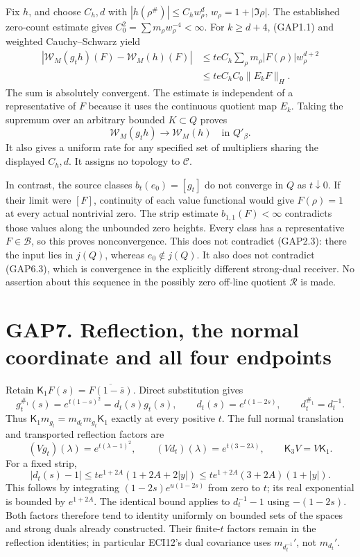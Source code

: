 Fix \(h\), and choose \(C_h,d\) with \(|h(\rho^\#)|\le C_h w_\rho^d\),
\(w_\rho=1+|\Im\rho|\). The established zero-count estimate gives
\(C_0^2=\sum m_\rho w_\rho^{-4}<\infty\). For \(k\ge d+4\), (GAP1.1) and
weighted Cauchy--Schwarz yield \[
\begin{aligned}
|\mathcal W_M(g_th)(F)-\mathcal W_M(h)(F)|
&\le teC_h\sum_\rho m_\rho|F(\rho)|w_\rho^{d+2}\\
&\le teC_h C_0\|E_kF\|_H.
\end{aligned}
\tag{GAP6.2}
\] The sum is absolutely convergent. The estimate is independent of a
representative of \(F\) because it uses the continuous quotient map
\(E_k\). Taking the supremum over an arbitrary bounded \(K\subset Q\)
proves \[
\boxed{\mathcal W_M(g_th)\longrightarrow\mathcal W_M(h)
\quad\text{in }Q'_\beta.}
\tag{GAP6.3}
\] It also gives a uniform rate for any specified set of multipliers
sharing the displayed \(C_h,d\). It assigns no topology to
\(\mathscr C\).

In contrast, the source classes \(b_t(e_0)=[g_t]\) do not converge in
\(Q\) as \(t\downarrow0\). If their limit were \([F]\), continuity of
each value functional would give \(F(\rho)=1\) at every actual
nontrivial zero. The strip estimate \(b_{1,1}(F)<\infty\) contradicts
those values along the unbounded zero heights. Every class has a
representative \(F\in\mathcal B\), so this proves nonconvergence. This
does not contradict (GAP2.3): there the input lies in \(j(Q)\), whereas
\(e_0\notin j(Q)\). It also does not contradict (GAP6.3), which is
convergence in the explicitly different strong-dual receiver. No
assertion about this sequence in the possibly zero off-line quotient
\(\mathcal R\) is made.

\section{GAP7. Reflection, the normal coordinate and all four
endpoints}\label{gap7.-reflection-the-normal-coordinate-and-all-four-endpoints}

Retain \(\mathsf K_1F(s)=\overline{F(1-\overline s)}\). Direct
substitution gives \[
g_t^{\#_1}(s)=e^{t(1-s)^2}=d_t(s)g_t(s),\qquad
d_t(s)=e^{t(1-2s)},\qquad d_t^{\#_1}=d_t^{-1}.
\tag{GAP7.1}
\] Thus \(\mathsf K_1m_{g_t}=m_{d_t}m_{g_t}\mathsf K_1\) exactly at
every positive \(t\). The full normal translation and transported
reflection factors are \[
(Vg_t)(\lambda)=e^{t(\lambda-1)^2},\qquad
(Vd_t)(\lambda)=e^{t(3-2\lambda)},\qquad
\mathsf K_3V=V\mathsf K_1.
\tag{GAP7.2}
\] For a fixed strip, \[
|d_t(s)-1|\le t e^{1+2A}(1+2A+2|y|)
\le t e^{1+2A}(3+2A)(1+|y|).
\tag{GAP7.3}
\] This follows by integrating \((1-2s)e^{u(1-2s)}\) from zero to \(t\);
its real exponential is bounded by \(e^{1+2A}\). The identical bound
applies to \(d_t^{-1}-1\) using \(-(1-2s)\). Both factors therefore tend
to identity uniformly on bounded sets of the spaces and strong duals
already constructed. Their finite-\(t\) factors remain in the reflection
identities; in particular ECI12's dual covariance uses
\(m_{d_t^{-1}}'\), not \(m_{d_t}'\).

